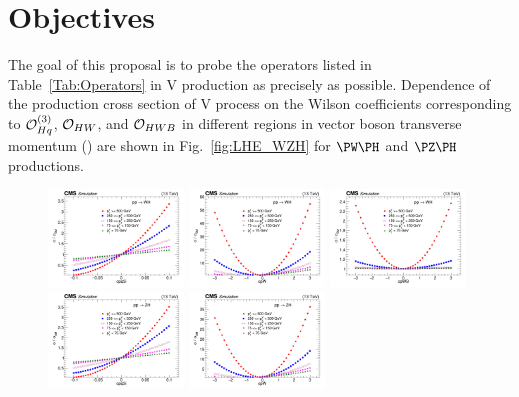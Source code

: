 \documentclass[a4paper,11pt]{article}
\renewcommand{\PV}{{{{V}}}\xspace}
\newcommand{\VH}{{{\PV}{\PH}}\xspace}
\begin{document}
\section{Objectives}
\label{sec:objective}

The goal of this proposal is to probe the operators listed in Table~\ref{Tab:Operators} in \VH production as precisely as possible.
Dependence of the production cross section of \VH process on the Wilson coefficients corresponding to ${\cal O}^{(3)}_{Hq}$, ${\cal O}_{HW}$, and ${\cal O}_{HWB}$ in different regions in vector boson transverse momentum (\pt) are shown in Fig.~\ref{fig:LHE_WZH} for $\PW\PH$ and $\PZ\PH$ productions. 
\begin{figure}[hbtp]
\begin{center}
\includegraphics[width=0.321\textwidth]{Figures/LHE/WH/Canv_cpq3i.png}
\includegraphics[width=0.321\textwidth]{Figures/LHE/WH/Canv_cpW.png}
\includegraphics[width=0.321\textwidth]{Figures/LHE/WH/Canv_cpWB.png}
\includegraphics[width=0.321\textwidth]{Figures/LHE/ZH/Canv_cpq3i.png}
\includegraphics[width=0.321\textwidth]{Figures/LHE/ZH/Canv_cpW.png}

\end{center}
\end{figure}
\end{document}
